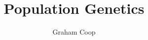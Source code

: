 \documentclass{tufte-book}
\begin{document}
\title{Population Genetics}
\author{Graham Coop}


\date{}
\maketitle

\tableofcontents

\newpage



%



%


\end{document}
